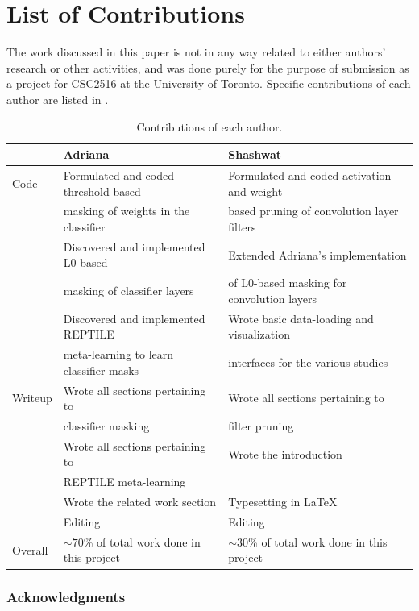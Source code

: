 \documentclass{article}
\begin{document}
\section{List of Contributions}

The work discussed in this paper is not in any way related to either authors' research or other activities, and was done purely for the purpose of submission as a project for CSC2516 at the University of Toronto. Specific contributions of each author are listed in .

\begin{table}[!h]
	\centering
	\caption{Contributions of each author.}
	\begin{tabular}{lll}
		\toprule
		& Adriana & Shashwat \\
		\midrule
		Code & Formulated and coded threshold-based & Formulated  and coded activation- and weight- \\
		& masking of weights in the classifier & based pruning of convolution layer filters \\[2mm]
		& Discovered and implemented L0-based & Extended Adriana's implementation \\
		& masking of classifier layers & of L0-based masking for convolution layers \\[2mm]
		& Discovered and implemented REPTILE & Wrote basic data-loading and visualization \\
		& meta-learning to learn classifier masks & interfaces for the various studies \\[2mm]
		Writeup & Wrote all sections pertaining to & Wrote all sections pertaining to \\
		& classifier masking & filter pruning\\[2mm]
		& Wrote all sections pertaining to & Wrote the introduction \\
		& REPTILE meta-learning & \\[2mm]
		& Wrote the related work section & Typesetting in \LaTeX \\[2mm]
		& Editing & Editing \\[2mm]
		Overall & $\sim 70$\% of total work done in this project & $\sim 30$\% of total work done in this project \\
		\bottomrule
	\end{tabular}
	\label{contr}
\end{table}




\subsubsection*{Acknowledgments}
\end{document}
